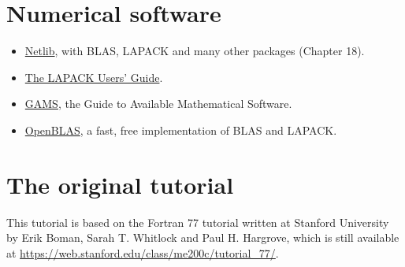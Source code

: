 \section{Numerical software}

\begin{itemize}
    \item \href{https://www.netlib.org}{Netlib}, with BLAS, LAPACK and many other packages (Chapter 18).
    \item \href{https://www.netlib.org/lapack/lug/}{The LAPACK Users' Guide}.
    \item \href{https://gams.nist.gov}{GAMS}, the Guide to Available Mathematical Software.
    \item \href{https://www.openblas.net}{OpenBLAS}, a fast, free implementation of BLAS and LAPACK.
\end{itemize}

\section{The original tutorial}

This tutorial is based on the Fortran 77 tutorial written at Stanford University by Erik Boman, Sarah T. Whitlock and Paul H. Hargrove, which is still available at \url{https://web.stanford.edu/class/me200c/tutorial_77/}.
